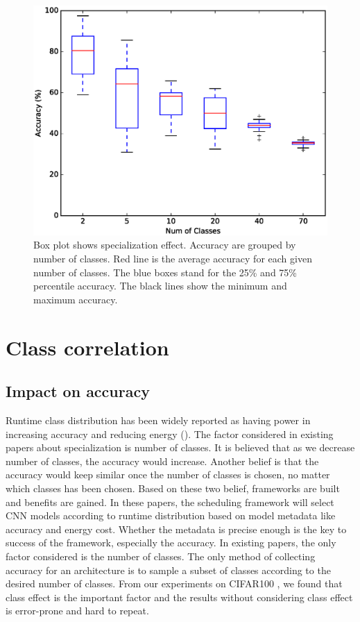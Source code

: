 \documentclass[conference]{IEEEtran}
\begin{document}
\begin{spacing}{0.9}
\begin{figure}
  \includegraphics[scale=0.4]{specialization.ps}
  \caption{Box plot shows specialization effect. Accuracy are grouped by number of classes. Red line is the average accuracy for each given number of classes. The blue boxes stand for the 25\% and 75\% percentile accuracy. The black lines show the minimum and maximum accuracy.}
  \label{fig:specialization}
\end{figure}



\section{Class correlation}
\subsection{Impact on accuracy}
Runtime class distribution has been widely reported as having power in increasing accuracy and reducing energy (\cite{han2016mcdnn, kang2017noscope, shen2017fast}). The factor considered in existing papers about specialization is number of classes. It is believed that as we decrease number of classes, the accuracy would increase. Another belief is that the accuracy would keep similar once the number of classes is chosen, no matter which classes has been chosen. Based on these two belief, frameworks \cite{han2016mcdnn, kang2017noscope, shen2016fast} are built and benefits are gained. In these papers, the scheduling framework will select CNN models according to runtime distribution based on model metadata like accuracy and energy cost. Whether the metadata is precise enough is the key to success of the framework, especially the accuracy. In existing papers, the only factor considered is the number of classes. The only method of collecting accuracy for an architecture is to sample a subset of classes according to the desired number of classes. From our experiments on CIFAR100 \cite{krizhevsky2009learning}, we found that class effect is the important factor and the results without considering class effect is error-prone and hard to repeat.


\end{spacing}
\end{document}

